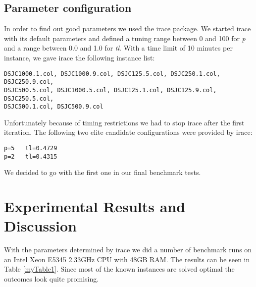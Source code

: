 \documentclass[a4paper]{scrartcl}
\begin{document}
\subsection{Parameter configuration}

In order to find out good parameters we used the irace package\cite{lopez2011irace}. We started irace with its default parameters and defined a tuning range between 0 and 100 for \emph{p} and a range between 0.0 and 1.0 for \emph{tl}.
With a time limit of 10 minutes per instance, we gave irace the following instance list:
\begin{verbatim}
DSJC1000.1.col, DSJC1000.9.col, DSJC125.5.col, DSJC250.1.col, DSJC250.9.col,
DSJC500.5.col, DSJC1000.5.col, DSJC125.1.col, DSJC125.9.col, DSJC250.5.col,
DSJC500.1.col, DSJC500.9.col
\end{verbatim}

Unfortunately because of timing restrictions we had to stop irace after the first iteration. The following two elite candidate configurations were provided by irace:

\begin{verbatim}
p=5   tl=0.4729
p=2   tl=0.4315
\end{verbatim}

We decided to go with the first one in our final benchmark tests.


\section{Experimental Results and Discussion}

With the parameters determined by irace we did a number of benchmark runs on an Intel Xeon E5345 2.33GHz CPU with 48GB RAM. The results can be seen in Table \ref{myTable1}.
Since most of the known instances are solved optimal the outcomes look quite promising.
\end{document}
